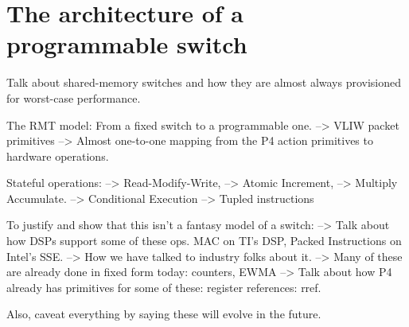 \section{The architecture of a programmable switch}
\label{s:architecture}
Talk about shared-memory switches and how they are almost always provisioned for worst-case performance.

The RMT model: From a fixed switch to a programmable one.
--> VLIW packet primitives
--> Almost one-to-one mapping from the P4 action
primitives to hardware operations.

Stateful operations:
--> Read-Modify-Write,
--> Atomic Increment,
--> Multiply Accumulate.
--> Conditional Execution
--> Tupled instructions

To justify and show that this isn't a fantasy model of a switch:
--> Talk about how DSPs support some of these ops.
    MAC on TI's DSP,
    Packed Instructions on Intel's SSE.
--> How we have talked to industry folks about it.
--> Many of these are already done in fixed form today:
    counters, EWMA
--> Talk about how P4 already has primitives for some of these:
    register references: rref.

Also, caveat everything by saying these will evolve in the
future.

